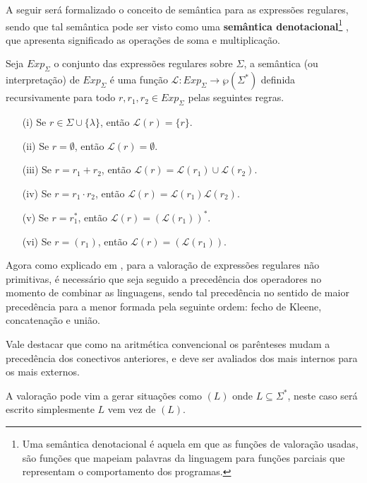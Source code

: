 A seguir será formalizado o conceito de semântica para as expressões regulares, sendo que tal semântica pode ser visto como uma \textbf{semântica denotacional}\footnote{Uma semântica denotacional é aquela em que as funções de valoração usadas, são funções que mapeiam palavras da linguagem para funções parciais que representam o comportamento dos programas.} \cite{scott1971}, que apresenta significado as operações de soma e multiplicação.

\begin{definition}\label{def:ExpRegularesSemantica}
	Seja $Exp_\Sigma$ o conjunto das expressões regulares sobre $\Sigma$,  a semântica (ou interpretação) de $Exp_\Sigma$ é uma função $\mathcal{L}: Exp_\Sigma \rightarrow \wp(\Sigma^*)$ definida recursivamente para todo $r, r_1, r_2  \in Exp_\Sigma$ pelas seguintes regras.
	\begin{itemize}
		\item[(i)] Se $r \in \Sigma \cup \{\lambda\}$, então $\mathcal{L}(r) = \{r\}$.
		\item[(ii)] Se $r = \emptyset$, então $\mathcal{L}(r) = \emptyset$.
		\item[(iii)] Se $r = r_1 + r_2$, então $\mathcal{L}(r) = \mathcal{L}(r_1) \cup \mathcal{L}(r_2)$.
		\item[(iv)] Se $r = r_1 \cdot r_2$, então $\mathcal{L}(r) = \mathcal{L}(r_1)\mathcal{L}(r_2)$.
		\item[(v)] Se $r = r_1^*$, então $\mathcal{L}(r) = (\mathcal{L}(r_1))^*$.
		\item[(vi)] Se $r = (r_1)$, então $\mathcal{L}(r) = (\mathcal{L}(r_1))$.	
	\end{itemize}
\end{definition}

Agora como explicado em \cite{carroll1989}, para a valoração de expressões regulares não primitivas, é necessário que seja seguido a precedência dos operadores no momento de combinar as linguagens, sendo tal precedência no sentido de maior precedência para a menor formada pela seguinte ordem: fecho de Kleene, concatenação e união.

\begin{remark}
	Vale destacar que como na aritmética convencional os parênteses mudam a precedência dos conectivos anteriores, e deve ser avaliados dos mais internos para os mais externos.
\end{remark}

\begin{note}
	A valoração pode vim a gerar situações como $(L)$ onde $L \subseteq \Sigma^*$, neste caso será escrito simplesmente $L$ vem vez de $(L)$.
\end{note}

